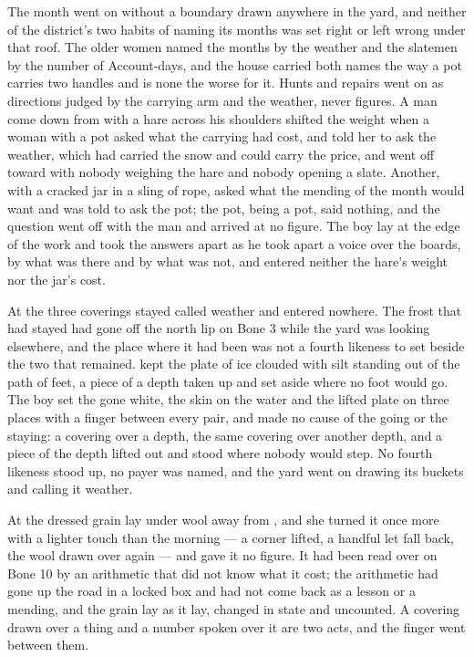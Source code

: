 The month went on without a boundary drawn anywhere in the yard, and neither of the district's two habits of naming its months was set right or left wrong under that roof. The older women named the months by the weather and the slatemen by the number of Account-days, and the house carried both names the way a pot carries two handles and is none the worse for it. Hunts and repairs went on as directions judged by the carrying arm and the weather, never figures. A man come down from  with a hare across his shoulders shifted the weight when a woman with a pot asked what the carrying had cost, and told her to ask the weather, which had carried the snow and could carry the price, and went off toward  with nobody weighing the hare and nobody opening a slate. Another, with a cracked jar in a sling of rope, asked what the mending of the month would want and was told to ask the pot; the pot, being a pot, said nothing, and the question went off with the man and arrived at no figure. The boy lay at the edge of the work and took the answers apart as he took apart a voice over the boards, by what was there and by what was not, and entered neither the hare's weight nor the jar's cost.

\scenebreak

At  the three coverings stayed called weather and entered nowhere. The frost that had stayed had gone off the north lip on Bone 3 while the yard was looking elsewhere, and the place where it had been was not a fourth likeness to set beside the two that remained.  kept the plate of ice clouded with silt standing out of the path of feet, a piece of a depth taken up and set aside where no foot would go. The boy set the gone white, the skin on the water and the lifted plate on three places with a finger between every pair, and made no cause of the going or the staying: a covering over a depth, the same covering over another depth, and a piece of the depth lifted out and stood where nobody would step. No fourth likeness stood up, no payer was named, and the yard went on drawing its buckets and calling it weather.

At  the dressed grain lay under wool away from , and she turned it once more with a lighter touch than the morning --- a corner lifted, a handful let fall back, the wool drawn over again --- and gave it no figure. It had been read over on Bone 10 by an arithmetic that did not know what it cost; the arithmetic had gone up the road in a locked box and had not come back as a lesson or a mending, and the grain lay as it lay, changed in state and uncounted. A covering drawn over a thing and a number spoken over it are two acts, and the finger went between them.

